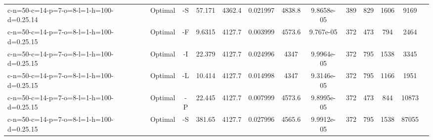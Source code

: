 \documentclass[landscape, a4paper]{article}
\begin{document}
\begin{center}
\begin{tabular}{lcccccccccccc}
c-n=50-c=14-p=7-o=8-l=1-h=100-d=0.25.14 & Optimal & -S & 57.171 & 4362.4 & 0.021997 & 4838.8 & 9.8658e-05 & 389 & 829 & 1606 & 9169 & \\
c-n=50-c=14-p=7-o=8-l=1-h=100-d=0.25.15 & Optimal & -F & 9.6315 & 4127.7 & 0.003999 & 4573.6 & 9.767e-05 & 372 & 473 & 794 & 2464 & \\
c-n=50-c=14-p=7-o=8-l=1-h=100-d=0.25.15 & Optimal & -I & 22.379 & 4127.7 & 0.024996 & 4347 & 9.9964e-05 & 372 & 795 & 1538 & 3345 & \\
c-n=50-c=14-p=7-o=8-l=1-h=100-d=0.25.15 & Optimal & -L & 10.414 & 4127.7 & 0.014998 & 4347 & 9.3146e-05 & 372 & 795 & 1166 & 1951 & \\
c-n=50-c=14-p=7-o=8-l=1-h=100-d=0.25.15 & Optimal & -P & 22.445 & 4127.7 & 0.007999 & 4573.6 & 9.8995e-05 & 372 & 473 & 844 & 10873 & \\
c-n=50-c=14-p=7-o=8-l=1-h=100-d=0.25.15 & Optimal & -S & 381.65 & 4127.7 & 0.027996 & 4565.6 & 9.9912e-05 & 372 & 795 & 1538 & 87055 & \\
\end{tabular}
\end{center}
\end{document}
